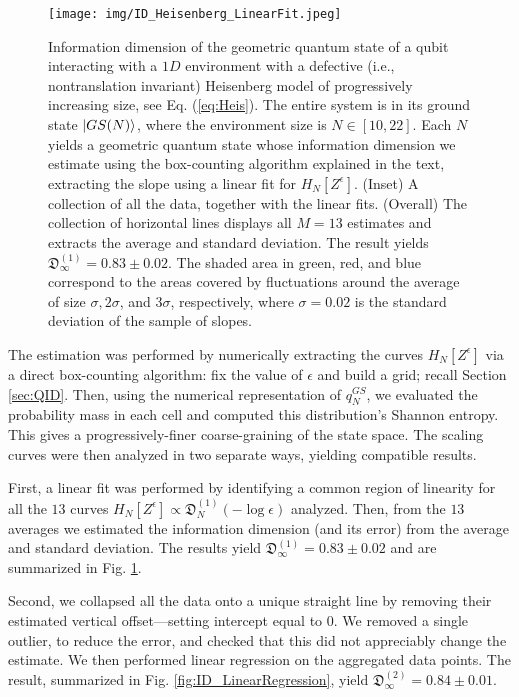 \documentclass[draft,nofootinbib,pre,twocolumn,showkeys,superscriptaddress,preprintnumbers,floatfix]{revtex4-1}
\newcommand{\1}{\mathbbm{1}}
\begin{document}
\begin{figure}[h]
\centering
\texttt{[image: img/ID\_Heisenberg\_LinearFit.jpeg]}
\caption{Information dimension of the geometric quantum state of a qubit
	interacting with a $1D$ environment with a defective (i.e., nontranslation
	invariant) Heisenberg model of progressively increasing size, see Eq.
	(\ref{eq:Heis}). The entire system is in its ground state $\ket{GS(N)}$,
	where the environment size is $N \in [10,22]$. Each $N$ yields a geometric
	quantum state whose information dimension we estimate using the
	box-counting algorithm explained in the text, extracting the slope using a
	linear fit for $H_N[Z^\epsilon]$. (Inset) A collection of all the data,
	together with the linear fits. (Overall) The collection of horizontal lines
	displays all $M=13$ estimates and extracts the average and standard
	deviation. The result yields $\mathfrak{D}^{(1)}_{\infty}= 0.83 \pm 0.02$. The
	shaded area in green, red, and blue correspond to the areas covered by
	fluctuations around the average of size $\sigma, 2\sigma$, and $3\sigma$,
	respectively, where $\sigma =0.02$ is the standard deviation of the sample
	of slopes.
	}
\label{fig:ID_LinearFit} 
\end{figure}

The estimation was performed by numerically extracting the curves
$H_N[Z^{\epsilon}]$ via a direct box-counting algorithm: fix the value of
$\epsilon$ and build a grid; recall Section \ref{sec:QID}. Then, using the
numerical representation of $q_N^{GS}$, we evaluated the probability mass in
each cell and computed this distribution's Shannon entropy. This gives a
progressively-finer coarse-graining of the state space. The scaling curves were
then analyzed in two separate ways, yielding compatible results.

First, a linear fit was performed by identifying a common region of linearity
for all the $13$ curves $H_N[Z^\epsilon] \propto \mathfrak{D}^{(1)}_N (-\log
\epsilon)$ analyzed. Then, from the $13$ averages we estimated the information
dimension (and its error) from the average and standard deviation.  The results
yield $\mathfrak{D}^{(1)}_{\infty} = 0.83 \pm 0.02$ and are summarized in Fig.
\ref{fig:ID_LinearFit}.

Second, we collapsed all the data onto a unique straight line by removing their
estimated vertical offset---setting intercept equal to $0$. We removed a single
outlier, to reduce the error, and checked that this did not appreciably change
the estimate. We then performed linear regression on the aggregated data
points. The result, summarized in Fig. \ref{fig:ID_LinearRegression},
yield $\mathfrak{D}^{(2)}_{\infty} = 0.84 \pm 0.01$.
\end{document}
